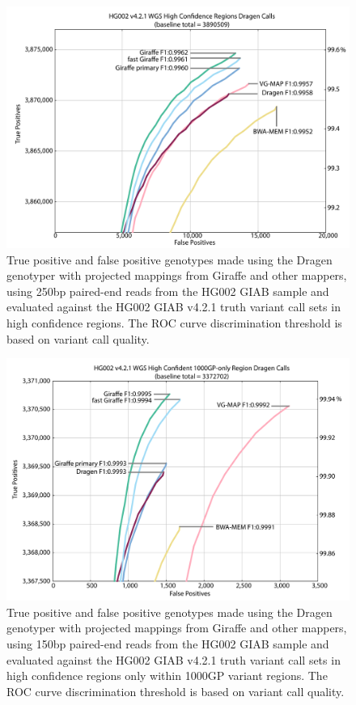 \documentclass[11pt]{ucscthesis}
\begin{document}
\begin{figure}[H]
    \centering
    \includegraphics[width=\linewidth]{HG002_v4.2.1_high_conf.35x_250bp.wgs.vcfevalroc.pdf}
    \caption[Genotyping evaluation for the Dragen genotyper with projected mappings from Giraffe and other mappers]{True positive and false positive genotypes made using the Dragen genotyper with projected mappings from Giraffe and other mappers, using 250bp paired-end reads from the HG002 GIAB sample and evaluated against the HG002 GIAB v4.2.1 truth variant call sets in high confidence regions. The ROC curve discrimination threshold is based on variant call quality.}
    \label{fig:250bp_genotyping}
\end{figure}
\begin{figure}[H]
    \centering
    \includegraphics[width=\linewidth]{HG002_v4.2.1_high_conf.35x_150bp.wgs.vcfevalroc.1000GP_only.pdf}
    \caption[Genotyping evaluation for the Dragen genotyper with projected mappings from Giraffe and other mappers in 1000GP regions only]{True positive and false positive genotypes made using the Dragen genotyper with projected mappings from Giraffe and other mappers, using 150bp paired-end reads from the HG002 GIAB sample and evaluated against the HG002 GIAB v4.2.1 truth variant call sets in high confidence regions only within 1000GP variant regions. The ROC curve discrimination threshold is based on variant call quality.}
    \label{fig:150bp_genotyping_1000GP_only}
\end{figure}
\end{document}
